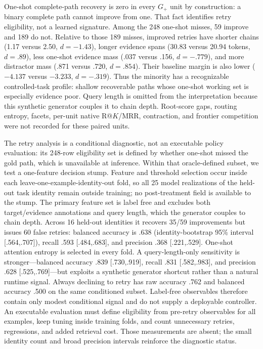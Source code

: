 One-shot complete-path recovery is zero in every $G_+$ unit by construction: a binary complete path
cannot improve from one.  That fact identifies retry eligibility, not a learned signature.  Among
the 248 one-shot misses, 59 improve and 189 do not.  Relative to those 189 misses, improved retries
have shorter chains (1.17 versus 2.50, $d=-1.43$), longer evidence spans (30.83 versus 20.94 tokens,
$d=.89$), less one-shot evidence mass (.037 versus .156, $d=-.779$), and more distractor mass (.871
versus .720, $d=.854$).  Their baseline margin is also lower ($-4.137$ versus $-3.233$, $d=-.319$).
Thus the minority has a recognizable controlled-task profile: shallow recoverable paths whose
one-shot working set is especially evidence poor.  Query length is omitted from the interpretation
because this synthetic generator couples it to chain depth.  Root-score gaps, routing entropy,
facets, per-unit native R@$K$/MRR, contraction, and frontier competition were not recorded for these
paired units.

The retry analysis is a conditional diagnostic, not an executable policy evaluation: its 248-row
eligibility set is defined by whether one-shot missed the gold path, which is unavailable at inference.
Within that oracle-defined subset, we test a one-feature decision stump.  Feature and threshold
selection occur inside each leave-one-example-identity-out fold, so all 25 model realizations of the
held-out task identity remain outside training; no post-treatment field is available to the stump.
The primary feature set is label free and excludes both target/evidence annotations and query length,
which the generator couples to chain depth.  Across 16 held-out identities it recovers 35/59
improvements but issues 60 false retries: balanced accuracy is .638 (identity-bootstrap 95\% interval
[.564,.707]), recall .593 [.484,.683], and precision .368 [.221,.529].  One-shot attention entropy is
selected in every fold.  A query-length-only sensitivity is stronger---balanced accuracy .839
[.730,.919], recall .831 [.582,.983], and precision .628 [.525,.769]---but exploits a synthetic
generator shortcut rather than a natural runtime signal.  Always declining to retry has raw accuracy
.762 and balanced accuracy .500 on the same conditioned subset.  Label-free observables therefore
contain only modest conditional signal and do not supply a deployable controller.  An executable
evaluation must define eligibility from pre-retry observables for all examples, keep tuning inside
training folds, and count unnecessary retries, regressions, and added retrieval cost.  Those
measurements are absent; the small identity count and broad precision intervals reinforce the
diagnostic status.

